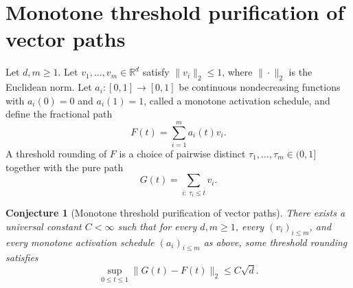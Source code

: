\documentclass[11pt]{article}
\newtheorem{conjecture}{Conjecture}
\theoremstyle{definition}
\newcommand{\R}{\mathbb R}
\providecommand{\R}{\mathbb R}
\begin{document}
\section{Monotone threshold purification of vector paths}

Let $d,m\ge1$.  Let $v_1,\ldots,v_m\in\R^d$ satisfy $\|v_i\|_2\le1$,
where $\|\cdot\|_2$ is the Euclidean norm.  Let
$a_i:[0,1]\to[0,1]$ be continuous nondecreasing functions with
$a_i(0)=0$ and $a_i(1)=1$, called a monotone activation schedule, and
define the fractional path
\[
F(t)=\sum_{i=1}^m a_i(t)v_i.
\]
A threshold rounding of $F$ is a choice of pairwise distinct
$\tau_1,\ldots,\tau_m\in(0,1]$ together with the pure path
\[
G(t)=\sum_{i:\ \tau_i\le t}v_i .
\]

\begin{conjecture}[Monotone threshold purification of vector paths]\label{t2}
There exists a universal constant $C<\infty$ such that for every
$d,m\ge1$, every $(v_i)_{i\le m}$, and every monotone activation
schedule $(a_i)_{i\le m}$ as above, some threshold rounding satisfies
\[
\sup_{0\le t\le1}\|G(t)-F(t)\|_2\le C\sqrt d .
\]
\end{conjecture}
\end{document}

